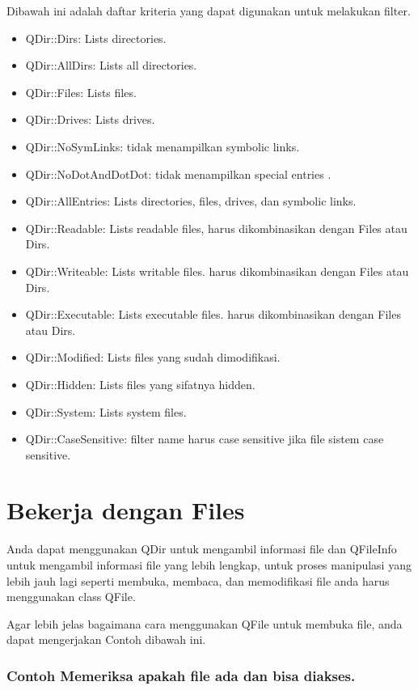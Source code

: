 Dibawah ini adalah daftar kriteria yang dapat digunakan untuk melakukan
filter.

\begin{itemize}

\item
  QDir::Dirs: Lists directories.
\item
  QDir::AllDirs: Lists all directories.
\item
  QDir::Files: Lists files.
\item
  QDir::Drives: Lists drives.
\item
  QDir::NoSymLinks: tidak menampilkan symbolic links.
\item
  QDir::NoDotAndDotDot: tidak menampilkan special entries .
\item
  QDir::AllEntries: Lists directories, files, drives, dan symbolic
  links.
\item
  QDir::Readable: Lists readable files, harus dikombinasikan dengan
  Files atau Dirs.
\item
  QDir::Writeable: Lists writable files. harus dikombinasikan dengan
  Files atau Dirs.
\item
  QDir::Executable: Lists executable files. harus dikombinasikan dengan
  Files atau Dirs.
\item
  QDir::Modified: Lists files yang sudah dimodifikasi.
\item
  QDir::Hidden: Lists files yang sifatnya hidden.
\item
  QDir::System: Lists system files.
\item
  QDir::CaseSensitive: filter name harus case sensitive jika file sistem
  case sensitive.
\end{itemize}

\section{Bekerja dengan Files}\label{bekerja-dengan-files}

Anda dapat menggunakan QDir untuk mengambil informasi file dan QFileInfo
untuk mengambil informasi file yang lebih lengkap, untuk proses
manipulasi yang lebih jauh lagi seperti membuka, membaca, dan
memodifikasi file anda harus menggunakan class QFile.

Agar lebih jelas bagaimana cara menggunakan QFile untuk membuka file,
anda dapat mengerjakan Contoh dibawah ini.

\subsubsection*{Contoh  Memeriksa apakah file ada dan bisa diakses.}

